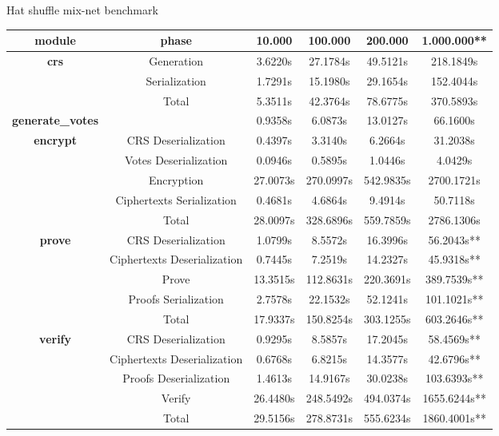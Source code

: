 \documentclass{standalone}
\begin{document}
\begin{threeparttable}
\caption{Hat shuffle mix-net benchmark}
\label{table:hatshuffle}
\begin{tabular}{c|c|cccc}
\hline
\textbf{module} & \textbf{phase} & \textbf{10.000} & \textbf{100.000} & \textbf{200.000} & \textbf{1.000.000}** \\
\hline
\hline
\multirow{2}{*}{\textbf{crs}} & Generation & 3.6220s & 27.1784s & 49.5121s & 218.1849s \\
& Serialization & 1.7291s & 15.1980s & 29.1654s & 152.4044s \\
\hline
& Total & 5.3511s & 42.3764s & 78.6775s & 370.5893s \\
\hline
\hline
\textbf{generate\_votes} & & 0.9358s & 6.0873s & 13.0127s & 66.1600s \\
\hline
\hline
\multirow{4}{*}{\textbf{encrypt}} & CRS Deserialization & 0.4397s & 3.3140s & 6.2664s & 31.2038s \\
& Votes Deserialization & 0.0946s & 0.5895s & 1.0446s & 4.0429s \\
& Encryption & 27.0073s & 270.0997s & 542.9835s & 2700.1721s \\
& Ciphertexts Serialization & 0.4681s & 4.6864s & 9.4914s & 50.7118s \\
\hline
& Total & 28.0097s & 328.6896s & 559.7859s & 2786.1306s \\
\hline
\hline
\multirow{4}{*}{\textbf{prove}} & CRS Deserialization & 1.0799s & 8.5572s & 16.3996s & 56.2043s** \\
& Ciphertexts Deserialization & 0.7445s & 7.2519s & 14.2327s & 45.9318s** \\
& Prove & 13.3515s & 112.8631s & 220.3691s & 389.7539s** \\
& Proofs Serialization & 2.7578s & 22.1532s & 52.1241s & 101.1021s** \\
\hline
& Total & 17.9337s & 150.8254s & 303.1255s & 603.2646s** \\
\hline
\hline
\multirow{4}{*}{\textbf{verify}} & CRS Deserialization & 0.9295s & 8.5857s & 17.2045s & 58.4569s** \\
& Ciphertexts Deserialization & 0.6768s & 6.8215s & 14.3577s & 42.6796s** \\
& Proofs Deserialization & 1.4613s & 14.9167s & 30.0238s & 103.6393s** \\
& Verify & 26.4480s & 248.5492s & 494.0374s & 1655.6244s** \\
\hline
& Total & 29.5156s & 278.8731s & 555.6234s & 1860.4001s** \\

\end{tabular}
\end{threeparttable}
\end{document}
